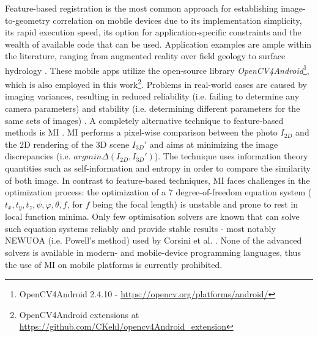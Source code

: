 \documentclass[review]{elsarticle}
\begin{document}
Feature-based registration is the most common approach for establishing image-to-geometry correlation on mobile devices due to its implementation simplicity, its rapid execution speed, its option for application-specific constraints and the wealth of available code that can be used. Application examples are ample within the literature, ranging from augmented reality \cite{Gauglitz2014,Sweeney2015} over field geology \cite{Kehl2016_ISPRS,Kehl2017_VGC} to surface hydrology \cite{Kroehnert2017a,Boerner2016}. These mobile apps utilize the open-source library \textit{OpenCV4Android}\footnote{OpenCV4Android 2.4.10 - \url{https://opencv.org/platforms/android/}}, which is also employed in this work\footnote{OpenCV4Android extensions at \url{https://github.com/CKehl/opencv4Android_extension}}. Problems in real-world cases are caused by imaging variances, resulting in reduced reliability (i.e. failing to determine any camera parameters) and stability (i.e. determining different parameters for the same sets of images) \cite{Kehl2017_PHOR}. A completely alternative technique to feature-based methods is \gls{MI} \cite{Viola1997,Corsini2013}. \Gls{MI} performs a pixel-wise comparison between the photo $I_{2D}$ and the 2D rendering of the 3D scene $I_{3D}'$ and aims at minimizing the image discrepancies (i.e. $argmin \Delta(I_{2D}, I_{3D}')$). The technique uses information theory quantities such as self-information and entropy in order to compare the similarity of both image. In contrast to feature-based techniques, \gls{MI} faces challenges in the optimization process: the optimization of a 7 degree-of-freedom equation system ($t_x,t_y,t_z,\psi,\varphi,\theta,f$, for $f$ being the focal length) is unstable and prone to rest in local function minima. Only few optimisation solvers are known that can solve such equation systems reliably and provide stable results - most notably NEWUOA (i.e. Powell's method\cite{Powell2006}) used by Corsini et al. \cite{Corsini2013}. None of the advanced solvers is available in modern- and mobile-device programming languages, thus the use of \gls{MI} on mobile platforms is currently prohibited.
\end{document}
